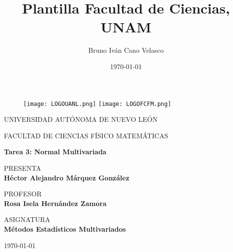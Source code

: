 \documentclass{article}
\title{Plantilla Facultad de Ciencias, UNAM}
\author{Bruno Iván Cano Velasco}
\date{\today}
\begin{document}
\thispagestyle{empty}
	
	\begin{figure}[ht]
			\texttt{[image: LOGOUANL.png]}
			\label{EscudoUNAM}
	   \endminipage
			\texttt{[image: LOGOFCFM.png]}
			\label{EscudoFC}
		\endminipage
	\end{figure}
	
	\begin{center}
	\vspace{0.8cm}
	\LARGE
	UNIVERSIDAD AUTÓNOMA DE NUEVO LEÓN
	
	\vspace{0.8cm}
	\LARGE
	FACULTAD DE CIENCIAS FÍSICO MATEMÁTICAS
	
	\vspace{1.7cm}	
	\Large
	\textbf{Tarea 3: Normal Multivariada}

	\vspace{1.3cm}
	\normalsize	
	PRESENTA \\
	\vspace{.3cm}
	\large
	\textbf{Héctor Alejandro Márquez González}
	
	\vspace{1.3cm}
	\normalsize	
	PROFESOR \\
	\vspace{.3cm}
	\large
	\textbf{Rosa Isela Hernández Zamora}
	
	\vspace{1.3cm}
	\normalsize	
	ASIGNATURA \\
	\vspace{.3cm}
	\large
	\textbf{Métodos Estadísticos Multivariados}
	
	\vspace{1.3cm}
	\today
	\end{center}
	
	\newpage
	
\end{document}
